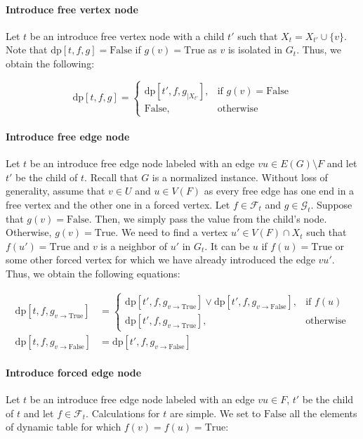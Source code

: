\documentclass[en]{pracamgr}
\theoremstyle{definition}
\newcommand{\dpt}[1]{\textrm{dp}[#1]}
\newcommand{\true}{\textrm{True}}
\newcommand{\false}{\textrm{False}}
\begin{document}
\paragraph{Introduce free vertex node} Let $t$ be an introduce free vertex node with a child $t'$ such that $X_t = X_{t'} \cup \{v\}$. Note that $\dpt{t,f,g}=\false$ if $g(v)=\true$ as $v$ is isolated in $G_t$. Thus, we obtain the following:

\begin{equation*}
	\dpt{t,f,g} =
	\begin{cases}
		\dpt{t',f,g_{|X_{t'}}}, & \text{if $g(v)=\false$} \\
		\false, &\text{otherwise}
	\end{cases}
\end{equation*}

\paragraph{Introduce free edge node} Let $t$ be an introduce free edge node labeled with an edge $vu \in E(G) \setminus F$ and let $t'$ be the child of $t$. Recall that $G$ is a normalized instance. Without loss of generality, assume that $v \in U$ and $u \in V(F)$ as every free edge has one end in a free vertex and the other one in a forced vertex. Let $f \in \mathcal{F}_t$ and $g \in \mathcal{G}_t$. Suppose that $g(v)=\false$. Then, we simply pass the value from the child's node. Otherwise, $g(v)=\true$. We need to find a vertex $u' \in V(F) \cap X_t$ such that $f(u')=\true$ and $v$ is a neighbor of $u'$ in $G_t$. It can be $u$ if $f(u)=\true$ or some other forced vertex for which we have already introduced the edge $vu'$. Thus, we obtain the following equations:

\begin{equation*}
\begin{split}
	\dpt{t,f,g_{v \rightarrow \true}} & = 
		\begin{cases}
			\dpt{t',f,g_{v \rightarrow \true}} \lor \dpt{t',f,g_{v \rightarrow \false}}, & \text{if $f(u)$} \\
			\dpt{t',f,g_{v \rightarrow \true}}, & \text{otherwise}
		\end{cases}	
	\\
	\dpt{t,f,g_{v \rightarrow \false}} & = \dpt{t',f,g_{v \rightarrow \false}}\end{split}
\end{equation*}

\paragraph{Introduce forced edge node} Let $t$ be an introduce free edge node labeled with an edge $vu \in F$, $t'$ be the child of $t$ and let $f \in \mathcal{F}_t$. Calculations for $t$ are simple. We set to $\false$ all the elements of dynamic table for which $f(v)=f(u)=\true$:
\end{document}
